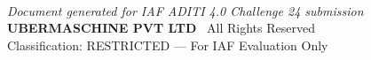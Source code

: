\documentclass[11pt,a4paper]{article}
\begin{document}
\vspace{1cm}
\begin{center}
\\[0.4cm]
{\small\textcolor{mitgray}{\textit{Document generated for IAF ADITI 4.0 Challenge 24 submission}}}\\
{\small\textbf{\textcolor{mitred}{UBERMASCHINE PVT LTD}} \textbar\ All Rights Reserved}\\
{\small\textcolor{mitgray}{Classification: RESTRICTED --- For IAF Evaluation Only}}
\end{center}
\end{document}
